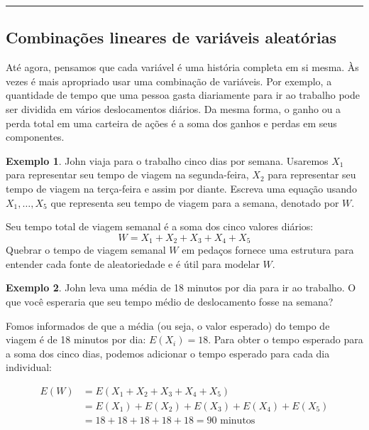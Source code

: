 \documentclass[
]{book}
\theoremstyle{definition}
\theoremstyle{definition}
\newtheorem{example}{Exemplo}[chapter]
\theoremstyle{definition}
\theoremstyle{definition}
\theoremstyle{remark}
\begin{document}
\begin{center}\rule{0.5\linewidth}{0.5pt}\end{center}

\hypertarget{linearCombinationRandomVariables}{%
\subsection{Combinações lineares de variáveis aleatórias}\label{linearCombinationRandomVariables}}

Até agora, pensamos que cada variável é uma história completa em si mesma. Às vezes é mais apropriado usar uma combinação de variáveis. Por exemplo, a quantidade de tempo que uma pessoa gasta diariamente para ir ao trabalho pode ser dividida em vários deslocamentos diários. Da mesma forma, o ganho ou a perda total em uma carteira de ações é a soma dos ganhos e perdas em seus componentes.

\begin{example}
\protect\hypertarget{exm:unnamed-chunk-76}{}{\label{exm:unnamed-chunk-76} }John viaja para o trabalho cinco dias por semana. Usaremos \(X_1\) para representar seu tempo de viagem na segunda-feira, \(X_2\) para representar seu tempo de viagem na terça-feira e assim por diante. Escreva uma equação usando \(X_1, \dots, X_5\) que representa seu tempo de viagem para a semana, denotado por \(W\).
\end{example}

Seu tempo total de viagem semanal é a soma dos cinco valores diários:
\[W = X_1 + X_2 + X_3 + X_4 + X_5\]
Quebrar o tempo de viagem semanal \(W\) em pedaços fornece uma estrutura para entender cada fonte de aleatoriedade e é útil para modelar \(W\).

\begin{example}
\protect\hypertarget{exm:unnamed-chunk-77}{}{\label{exm:unnamed-chunk-77} }John leva uma média de 18 minutos por dia para ir ao trabalho. O que você esperaria que seu tempo médio de deslocamento fosse na semana?
\end{example}

Fomos informados de que a média (ou seja, o valor esperado) do tempo de viagem é de 18 minutos por dia: \(E(X_i) = 18\). Para obter o tempo esperado para a soma dos cinco dias, podemos adicionar o tempo esperado para cada dia individual:

\begin{align*}
E(W) &= E(X_1 + X_2 + X_3 + X_4 + X_5) \\
    &= E(X_1) + E(X_2) + E(X_3) + E(X_4) + E(X_5) \\
    &= 18 + 18 + 18 + 18 + 18 = 90\text{ minutos}
\end{align*}
\end{document}
